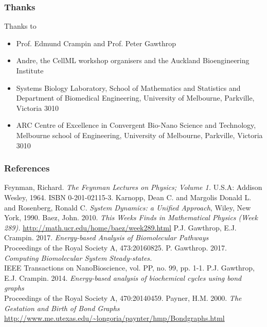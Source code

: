 \documentclass[11pt,reqno]{beamer}
\begin{document}
\begin{frame}
\frametitle{Thanks}
{\small
Thanks to
\begin{itemize}
		\itemsep1em
	\item Prof. Edmund Crampin and Prof. Peter Gawthrop
	\item Andre, the CellML workshop organisers and the Auckland Bioengineering Institute
\item Systems Biology Laboratory, School of Mathematics and Statistics and Department of Biomedical Engineering, University of Melbourne, Parkville, Victoria 3010
\item ARC Centre of Excellence in Convergent Bio-Nano Science and Technology,
Melbourne school of Engineering, 
University of Melbourne, Parkville, Victoria 3010
\end{itemize}
}
\end{frame}
\begin{frame}
\frametitle{References}
{\tiny
	\begin{thebibliography}{6}
		 Feynman, Richard. \emph{The Feynman Lectures on Physics; Volume 1.} U.S.A: Addison Wesley, 1964. ISBN 0-201-02115-3.
		 Karnopp, Dean C. and Margolis Donald L. and Rosenberg, Ronald C. \emph{System Dynamics: a Unified Approach}, Wiley, New York, 1990.
		 Baez, John. 2010. \emph{This Weeks Finds in Mathematical Physics (Week 289).} \url{http://math.ucr.edu/home/baez/week289.html}
		  P.J. Gawthrop, E.J. Crampin. 2017. \emph{Energy-based Analysis of Biomolecular Pathways}\\
		Proceedings of the Royal Society A, 473:20160825.
		 P. Gawthrop. 2017. \emph{Computing Biomolecular System Steady-states.}\\
		IEEE Transactions on NanoBioscience, vol. PP, no. 99, pp. 1-1. 
		 P.J. Gawthrop, E.J. Crampin. 2014. \emph{Energy-based analysis of biochemical cycles using bond graphs}\\
		Proceedings of the Royal Society A, 470:20140459.
		 Payner, H.M. 2000. \emph{The Gestation and Birth of Bond Graphs} \url{http://www.me.utexas.edu/\~longoria/paynter/hmp/Bondgraphs.html}
\end{thebibliography}}
\end{frame}
\end{document}
